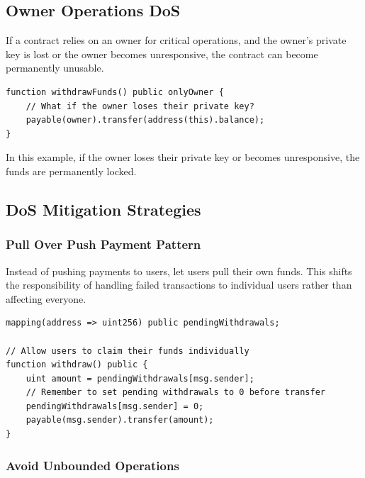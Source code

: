 \documentclass[12pt]{article}
\begin{document}
\subsection{Owner Operations DoS}

If a contract relies on an owner for critical operations, and the owner's
private key is lost or the owner becomes unresponsive, the contract can become
permanently unusable.

\noindent
\begin{minipage}{\textwidth}
    \begin{lstlisting}[language=Solidity, caption=Owner Operations DoS Example]
function withdrawFunds() public onlyOwner {
    // What if the owner loses their private key?
    payable(owner).transfer(address(this).balance);
}
\end{lstlisting}
\end{minipage}

\noindent
In this example, if the owner loses their private key or becomes unresponsive, the funds are permanently locked.

\subsection{DoS Mitigation Strategies}

\subsubsection*{Pull Over Push Payment Pattern}

Instead of pushing payments to users, let users pull their own funds. This
shifts the responsibility of handling failed transactions to individual users
rather than affecting everyone.

\noindent
\begin{minipage}{\textwidth}
    \begin{lstlisting}[language=Solidity, caption=Pull Over Push Example]
mapping(address => uint256) public pendingWithdrawals;

// Allow users to claim their funds individually
function withdraw() public {
    uint amount = pendingWithdrawals[msg.sender];
    // Remember to set pending withdrawals to 0 before transfer
    pendingWithdrawals[msg.sender] = 0;
    payable(msg.sender).transfer(amount);
}
\end{lstlisting}
\end{minipage}

\subsubsection*{Avoid Unbounded Operations}
\end{document}
